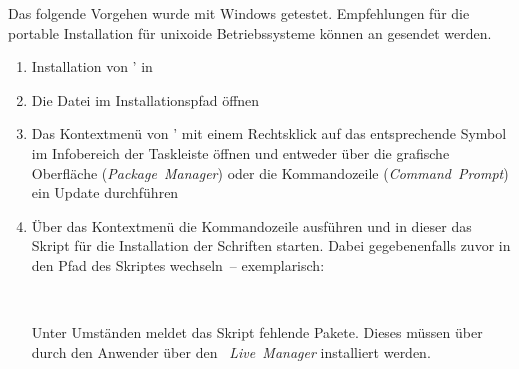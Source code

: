%
Das folgende Vorgehen wurde mit Windows getestet. Empfehlungen für die portable 
Installation für unixoide Betriebssysteme können an \mailto{\TUDScriptContact} 
gesendet werden.
\begin{enumerate}
\item Installation von \TeXLive' in 
\item Die Datei  im Installationspfad öffnen
\item Das Kontextmenü von \TeXLive' mit einem Rechtsklick auf das entsprechende 
  Symbol im Infobereich der Taskleiste öffnen und entweder über die grafische 
  Oberfläche (\emph{Package~Manager}) oder die Kommandozeile 
  (\emph{Command~Prompt}) ein Update durchführen
\item Über das Kontextmenü die Kommandozeile ausführen und in dieser das Skript 
  für die Installation der Schriften  
  starten. Dabei gegebenenfalls zuvor in den Pfad des Skriptes 
  wechseln~-- exemplarisch:
  \begin{quoting}[leftmargin=1.5em,rightmargin=0pt]
  \newline%
  \,
  \end{quoting}
  Unter Umständen meldet das Skript fehlende Pakete. Dieses müssen über durch 
  den Anwender über den \emph{~Live~Manager} installiert werden.
\end{enumerate}

